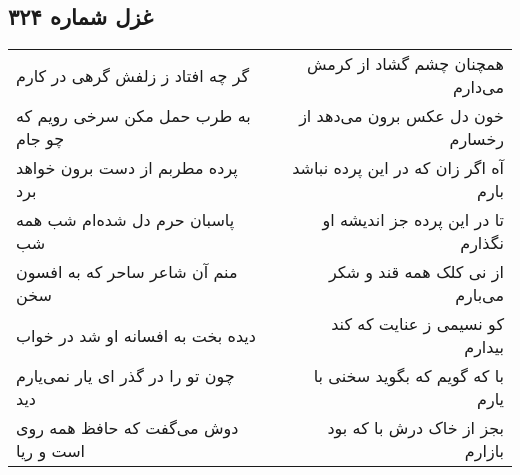 \begin{center}
\section*{غزل شماره ۳۲۴}
\label{sec:sh324}
\begin{longtable}{l p{0.5cm} r}
گر چه افتاد ز زلفش گرهی در کارم
&&
همچنان چشم گشاد از کرمش می‌دارم
\\
به طرب حمل مکن سرخی رویم که چو جام
&&
خون دل عکس برون می‌دهد از رخسارم
\\
پرده مطربم از دست برون خواهد برد
&&
آه اگر زان که در این پرده نباشد بارم
\\
پاسبان حرم دل شده‌ام شب همه شب
&&
تا در این پرده جز اندیشه او نگذارم
\\
منم آن شاعر ساحر که به افسون سخن
&&
از نی کلک همه قند و شکر می‌بارم
\\
دیده بخت به افسانه او شد در خواب
&&
کو نسیمی ز عنایت که کند بیدارم
\\
چون تو را در گذر ای یار نمی‌یارم دید
&&
با که گویم که بگوید سخنی با یارم
\\
دوش می‌گفت که حافظ همه روی است و ریا
&&
بجز از خاک درش با که بود بازارم
\\
\end{longtable}
\end{center}
